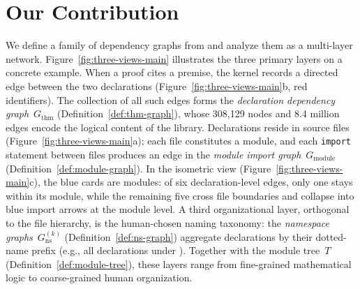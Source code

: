 \section{Our Contribution}
\label{sec:contribution}

We define a family of dependency graphs from  and analyze them as a multi-layer network. Figure~\ref{fig:three-views-main} illustrates the three primary layers on a concrete example. When a proof cites a premise, the kernel records a directed edge between the two declarations (Figure~\ref{fig:three-views-main}b, red identifiers). The collection of all such edges forms the \emph{declaration dependency graph}~$G_{\mathrm{thm}}$ (Definition~\ref{def:thm-graph}), whose 308,129 nodes and 8.4 million edges encode the logical content of the library. Declarations reside in source files (Figure~\ref{fig:three-views-main}a); each file constitutes a module, and each \texttt{import} statement between files produces an edge in the \emph{module import graph}~$G_{\mathrm{module}}$ (Definition~\ref{def:module-graph}). In the isometric view (Figure~\ref{fig:three-views-main}c), the blue cards are modules: of six declaration-level edges, only one stays within its module, while the remaining five cross file boundaries and collapse into blue import arrows at the module level. A third organizational layer, orthogonal to the file hierarchy, is the human-chosen naming taxonomy: the \emph{namespace graphs}~$G_{\mathrm{ns}}^{(k)}$ (Definition~\ref{def:ns-graph}) aggregate declarations by their dotted-name prefix (e.g., all declarations under ). Together with the module tree~$T$ (Definition~\ref{def:module-tree}), these layers range from fine-grained mathematical logic to coarse-grained human organization.

